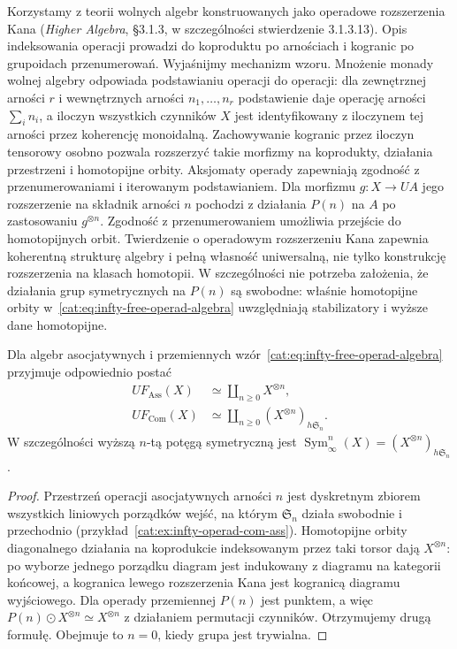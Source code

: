 Korzystamy z teorii wolnych algebr konstruowanych jako operadowe rozszerzenia Kana (\emph{Higher Algebra}, \S3.1.3, w szczególności stwierdzenie 3.1.3.13). Opis indeksowania operacji prowadzi do koproduktu po arnościach i kogranic po grupoidach przenumerowań. Wyjaśnijmy mechanizm wzoru. Mnożenie monady wolnej algebry odpowiada podstawianiu operacji do operacji: dla zewnętrznej arności $r$ i wewnętrznych arności $n_1,\ldots,n_r$ podstawienie daje operację arności $\sum_i n_i$, a iloczyn wszystkich czynników $X$ jest identyfikowany z iloczynem tej arności przez koherencję monoidalną. Zachowywanie kogranic przez iloczyn tensorowy osobno pozwala rozszerzyć takie morfizmy na koprodukty, działania przestrzeni i homotopijne orbity. Aksjomaty operady zapewniają zgodność z przenumerowaniami i iterowanym podstawianiem. Dla morfizmu $g:X\to UA$ jego rozszerzenie na składnik arności $n$ pochodzi z działania $P(n)$ na $A$ po zastosowaniu $g^{\otimes n}$. Zgodność z przenumerowaniem umożliwia przejście do homotopijnych orbit. Twierdzenie o operadowym rozszerzeniu Kana zapewnia koherentną strukturę algebry i pełną własność uniwersalną, nie tylko konstrukcję rozszerzenia na klasach homotopii. W szczególności nie potrzeba założenia, że działania grup symetrycznych na $P(n)$ są swobodne: właśnie homotopijne orbity w~\eqref{cat:eq:infty-free-operad-algebra} uwzględniają stabilizatory i wyższe dane homotopijne.

\begin{wniosek}\label{cat:cor:infty-free-ass-com}
Dla algebr asocjatywnych i przemiennych wzór~\eqref{cat:eq:infty-free-operad-algebra} przyjmuje odpowiednio postać
\[
 \begin{aligned}
 UF_{\mathrm{Ass}}(X)&\simeq\coprod_{n\geq0}X^{\otimes n},\\
 UF_{\mathrm{Com}}(X)&\simeq\coprod_{n\geq0}(X^{\otimes n})_{h\mathfrak S_n}.
 \end{aligned}
\]
W szczególności wyższą $n$-tą potęgą symetryczną jest $\operatorname{Sym}^n_\infty(X)=(X^{\otimes n})_{h\mathfrak S_n}$.
\end{wniosek}
\begin{proof}
Przestrzeń operacji asocjatywnych arności $n$ jest dyskretnym zbiorem wszystkich liniowych porządków wejść, na którym $\mathfrak S_n$ działa swobodnie i przechodnio (przykład~\ref{cat:ex:infty-operad-com-ass}). Homotopijne orbity diagonalnego działania na koprodukcie indeksowanym przez taki torsor dają $X^{\otimes n}$: po wyborze jednego porządku diagram jest indukowany z diagramu na kategorii końcowej, a kogranica lewego rozszerzenia Kana jest kogranicą diagramu wyjściowego. Dla operady przemiennej $P(n)$ jest punktem, a więc $P(n)\odot X^{\otimes n}\simeq X^{\otimes n}$ z działaniem permutacji czynników. Otrzymujemy drugą formułę. Obejmuje to $n=0$, kiedy grupa jest trywialna.
\end{proof}

